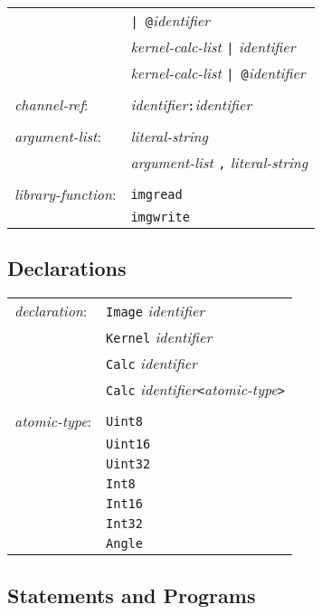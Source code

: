 \begin{center}
\begin{tabular}{l l}
& \texttt{| @}\emph{identifier}\\
& \emph{kernel-calc-list} \texttt{|} \emph{identifier}\\
& \emph{kernel-calc-list} \texttt{| @}\emph{identifier}\\
\\
\emph{channel-ref}: & \emph{identifier}\texttt{:}\emph{identifier}\\
\\
\emph{argument-list}: & \emph{literal-string}\\
& \emph{argument-list} \texttt{,} \emph{literal-string}\\
\\
\emph{library-function}: & \texttt{imgread}\\
& \texttt{imgwrite}\\
\end{tabular}\end{center}

\subsection{Declarations}

\begin{center}\begin{tabular}{l l}
\emph{declaration}: & \texttt{Image} \emph{identifier}\\
& \texttt{Kernel} \emph{identifier}\\
& \texttt{Calc} \emph{identifier}\\
& \texttt{Calc} \emph{identifier}\texttt{<}\emph{atomic-type}\texttt{>}\\
\\
\emph{atomic-type}: & \texttt{Uint8}\\
& \texttt{Uint16}\\
& \texttt{Uint32}\\
& \texttt{Int8}\\
& \texttt{Int16}\\
& \texttt{Int32}\\
& \texttt{Angle}\\
\end{tabular}\end{center}


\subsection{Statements and Programs}

